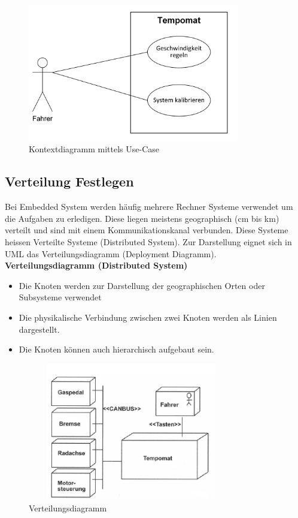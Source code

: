\begin{figure}[h]
	\centering
	\includegraphics[height=6cm]{images/Modellierung/Systemgrenze}
	\caption{Kontextdiagramm mittels Use-Case}
\end{figure}

\subsection{Verteilung Festlegen }
Bei Embedded System werden häufig mehrere Rechner Systeme verwendet um die Aufgaben zu erledigen. Diese liegen meistens 
geographisch (cm bis km) verteilt und sind mit einem Kommunikationskanal verbunden. Diese Systeme heissen Verteilte Systeme 
(Distributed System). Zur Darstellung eignet sich in UML das Verteilungsdiagramm (Deployment Diagramm).\\

\textbf{Verteilungsdiagramm (Distributed System)}
\begin{itemize}
	\item Die Knoten werden zur Darstellung der geographischen Orten oder Subsysteme verwendet
	\item Die physikalische Verbindung zwischen zwei Knoten werden als Linien dargestellt.
	\item Die Knoten können auch hierarchisch aufgebaut sein.
\end{itemize}

\begin{figure}[h]
	\centering
	\includegraphics[height=6cm, width = 9cm,]{images/Modellierung/Verteilungsdiagramm}
	\caption{Verteilungsdiagramm}
\end{figure}

